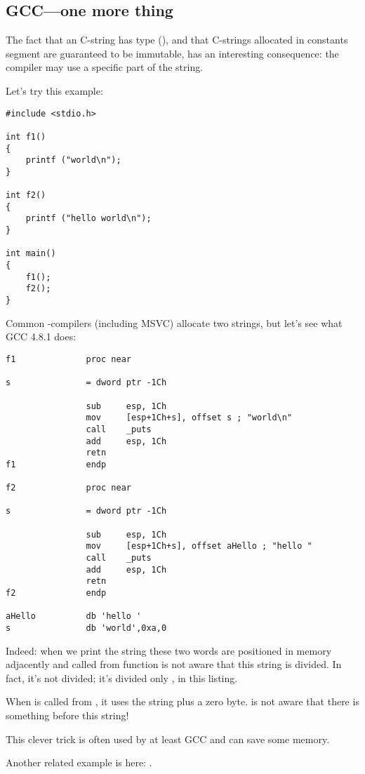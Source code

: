 \subsection{GCC---one more thing}
\label{use_parts_of_C_strings}

The fact that an  C-string has  type (), 
and that C-strings allocated in constants segment are guaranteed to be immutable, has an interesting consequence:
the compiler may use a specific part of the string.

Let's try this example:

\begin{lstlisting}
#include <stdio.h>

int f1()
{
	printf ("world\n");
}

int f2()
{
	printf ("hello world\n");
}

int main()
{
	f1();
	f2();
}
\end{lstlisting}

Common \CCpp{}-compilers (including MSVC) allocate two strings, but let's see what GCC 4.8.1 does:

\begin{lstlisting}[caption=GCC 4.8.1 + IDA listing]
f1              proc near

s               = dword ptr -1Ch

                sub     esp, 1Ch
                mov     [esp+1Ch+s], offset s ; "world\n"
                call    _puts
                add     esp, 1Ch
                retn
f1              endp

f2              proc near

s               = dword ptr -1Ch

                sub     esp, 1Ch
                mov     [esp+1Ch+s], offset aHello ; "hello "
                call    _puts
                add     esp, 1Ch
                retn
f2              endp

aHello          db 'hello '
s               db 'world',0xa,0
\end{lstlisting}

Indeed: when we print the  string
these two words are positioned in memory adjacently and \puts called from 
function is not aware that this string is divided. 
In fact, it's not divided; it's divided only , in this listing.

When \puts is called from , it uses the  string plus a zero byte. \puts is not aware that there is something before this string!

This clever trick is often used by at least GCC and can save some memory.

Another related example is here: .

